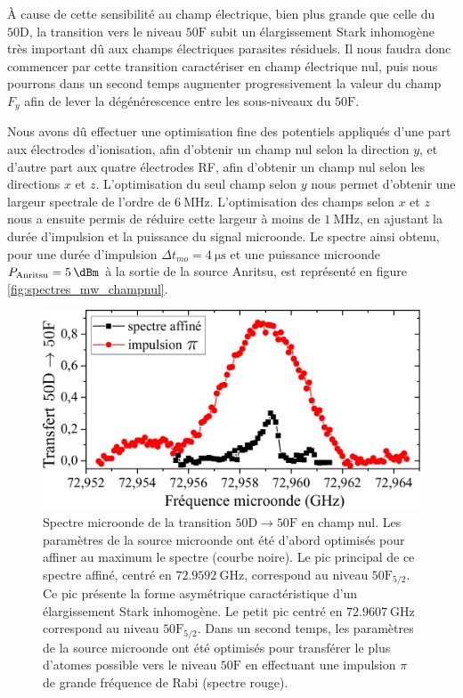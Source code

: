 \`A cause de cette sensibilité au champ électrique, bien plus grande que celle du $\mathrm{50D}$, la transition vers le niveau $\mathrm{50F}$ subit un élargissement Stark inhomogène très important dû aux champs électriques parasites résiduels.
Il nous faudra donc commencer par cette transition caractériser en champ électrique nul, puis nous pourrons dans un second temps augmenter progressivement la valeur du champ $F_y$ afin de lever la dégénérescence entre les sous-niveaux du $\mathrm{50F}$.

Nous avons dû effectuer une optimisation fine des potentiels appliqués d'une part aux électrodes d'ionisation, afin d'obtenir un champ nul selon la direction $y$, et d'autre part aux quatre électrodes RF, afin d'obtenir un champ nul selon les directions $x$ et $z$.
L'optimisation du seul champ selon $y$ nous permet d'obtenir une largeur spectrale de l'ordre de $\SI{6}{\MHz}$.
L'optimisation des champs selon $x$ et $z$ nous a ensuite permis de réduire cette largeur à moins de $\SI{1}{\MHz}$, en ajustant la durée d'impulsion et la puissance du signal microonde.
Le spectre ainsi obtenu, pour une durée d'impulsion $\Delta t _{mo} = \SI{4}{\us}$ et une puissance microonde $P_{\text{Anritsu}} = \SI{5}{\dBm}$ à la sortie de la source Anritsu, est représenté en figure \eqref{fig:spectres_mw_champnul}.

\begin{figure}[!h]
\centering
\includegraphics[width=0.85\linewidth]{figures/circulars/spectres_mw_champnul}
\caption[Spectre microonde de la transition $\mathrm{50D\rightarrow 50F}$ en champ nul]{
Spectre microonde de la transition $\mathrm{50D\rightarrow 50F}$ en champ nul.
Les paramètres de la source microonde ont été d'abord optimisés pour affiner au maximum le spectre (courbe noire).
Le pic principal de ce spectre affiné, centré en $\SI{72.9592}{\GHz}$, correspond au niveau $\mathrm{50F}_{5/2}$. Ce pic présente la forme asymétrique caractéristique d'un élargissement Stark inhomogène.
Le petit pic centré en $\SI{72.9607}{\GHz}$ correspond au niveau $\mathrm{50F}_{5/2}$.
Dans un second temps, les paramètres de la source microonde ont été optimisés pour transférer le plus d'atomes possible vers le niveau $\mathrm{50F}$ en effectuant une impulsion $\pi$ de grande fréquence de Rabi (spectre rouge).
}
\label{fig:spectres_mw_champnul}
\end{figure}

